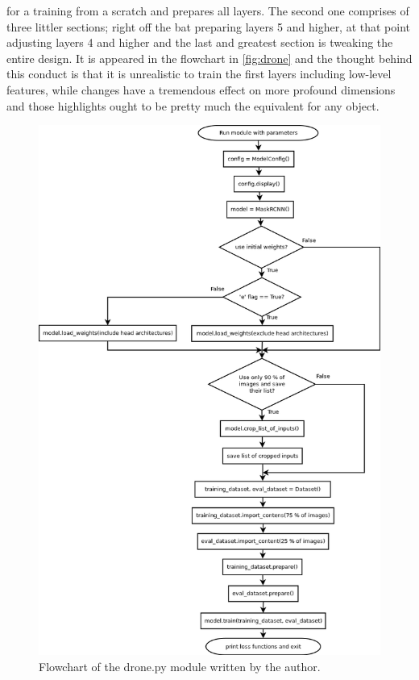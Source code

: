 for a training from a scratch and prepares all layers. The second one comprises of three littler sections; right off the bat preparing layers 5 and higher, at that point adjusting layers 4 and 
higher and the last and greatest section is tweaking the entire design. It is appeared in the flowchart in \ref{fig:drone} and the thought behind this conduct is that it is 
unrealistic to train the first layers including low-level features, while changes have a tremendous effect on more profound dimensions and those highlights ought to be pretty much the equivalent for any object.
\clearpage
\begin{figure}[H]
  \centering
  \includegraphics[width=0.8\linewidth]{images/drone-graph.png}
  \caption{Flowchart of the drone.py module written by the author.}
 \end{figure}
 \label{drone}
 \clearpage

